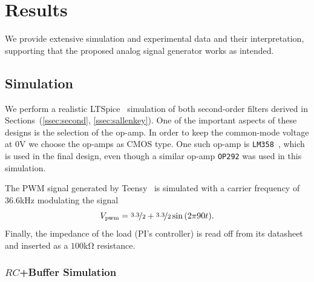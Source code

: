 \vspace{-1em}
\section{Results}
\label{sec:results}
\vspace{-1em}

We provide extensive simulation and experimental data and their interpretation,
supporting that the proposed analog signal generator works as intended.

\vspace{-1em}
\subsection{Simulation}
\vspace{-1em}

We perform a realistic LTSpice~\cite{ltspice} simulation of both second-order
filters derived in Sections~(\ref{ssec:second}, \ref{ssec:sallenkey}). One of
the important aspects of these designs is the selection of the op-amp. In order
to keep the common-mode voltage at $0$\unit{\volt} we choose the op-amps as CMOS
type. One such op-amp is \texttt{LM358}~\cite{lm358}, which is used in the final
design, even though a similar op-amp \texttt{OP292} was used in this simulation.

The PWM signal generated by Teensy~\cite{teensy} is simulated with a carrier
frequency of $36.6$\unit{\kilo\hertz} modulating the signal \[ V_{\text{pwm}} =
\nicefrac{3.3}{2} + \nicefrac{3.3}{2}\sin{(2\pi 90 t)}.\] Finally, the impedance
of the load (PI's controller) is read off from its datasheet and inserted as a
$100$\unit{\kilo\ohm} resistance. 

\vspace{-1em}
\subsubsection{$RC$+Buffer Simulation} 
\vspace{-1em}

